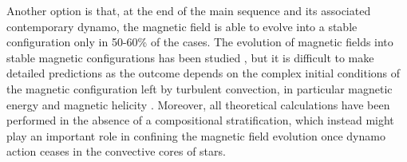 Another option is that, at the end of the main sequence and its associated contemporary dynamo, the magnetic field is able to evolve into a stable configuration only in 50-60\% of the cases. The evolution of magnetic fields into stable magnetic configurations has been studied \citep{Braithwaite_2006}, but it is difficult to make detailed predictions as the outcome depends on the complex initial conditions of the magnetic configuration left by turbulent convection, in particular magnetic energy and magnetic helicity \citep{Braithwaite_2008}. Moreover, all theoretical calculations have been performed in the absence of a compositional stratification, which instead might play an important role in confining the magnetic field evolution once dynamo action ceases in the convective cores of stars. 